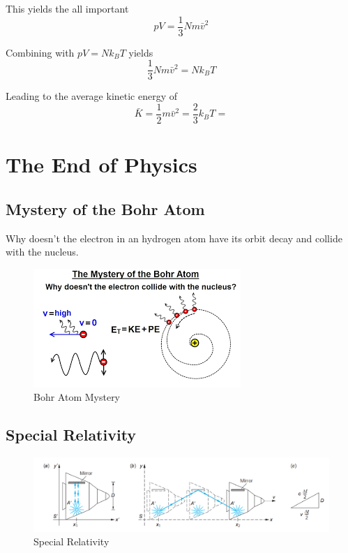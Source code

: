 \documentclass[14pt]{memoir}
\begin{document}
This yields the all important
\begin{equation}
pV = \frac{1}{3} N m \bar{v}^2
\end{equation}

Combining with $pV = N k_B T$ yields
\begin{equation}
\frac{1}{3} N m \bar{v}^2 = N k_B T
\end{equation}

Leading to the average kinetic energy of
\begin{equation}
\bar{K} = \frac{1}{2} m \bar{v}^2 = \frac{2}{3} k_B T = 
\end{equation}



\chapter{The End of Physics}

\section{Mystery of the Bohr Atom}

Why doesn't the electron in an hydrogen atom have its orbit decay and collide with the nucleus.

\begin{figure}[H]
\begin{center}
\includegraphics[scale=.6]{fig/bohrmystery.png}
\caption{Bohr Atom Mystery}
\label{fig:bm}
\end{center}
\end{figure} 

\section{Special Relativity}

\begin{figure}[H]
\begin{center}
\includegraphics[scale=0.5]{fig/lightclock.png}
\caption{Special Relativity}
\label{fig:lc}
\end{center}
\end{figure} 
\end{document}
